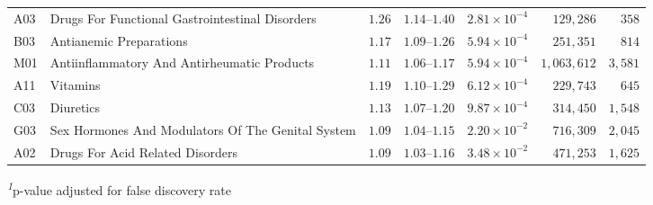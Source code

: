 \begin{longtable}{llrrrrr}
A03 & Drugs For Functional Gastrointestinal Disorders & $1.26$ & $1.14$–$1.40$ & $2.81 \times 10^{-4}$ & $129,286$ & $358$ \\ 
B03 & Antianemic Preparations & $1.17$ & $1.09$–$1.26$ & $5.94 \times 10^{-4}$ & $251,351$ & $814$ \\ 
M01 & Antiinflammatory And Antirheumatic Products & $1.11$ & $1.06$–$1.17$ & $5.94 \times 10^{-4}$ & $1,063,612$ & $3,581$ \\ 
A11 & Vitamins & $1.19$ & $1.10$–$1.29$ & $6.12 \times 10^{-4}$ & $229,743$ & $645$ \\ 
C03 & Diuretics & $1.13$ & $1.07$–$1.20$ & $9.87 \times 10^{-4}$ & $314,450$ & $1,548$ \\ 
G03 & Sex Hormones And Modulators Of The Genital System & $1.09$ & $1.04$–$1.15$ & $2.20 \times 10^{-2}$ & $716,309$ & $2,045$ \\ 
A02 & Drugs For Acid Related Disorders & $1.09$ & $1.03$–$1.16$ & $3.48 \times 10^{-2}$ & $471,253$ & $1,625$ \\ 
\bottomrule
\end{longtable}
\begin{minipage}{\linewidth}
\textsuperscript{\textit{1}}p-value adjusted for false discovery rate\\
\end{minipage}

